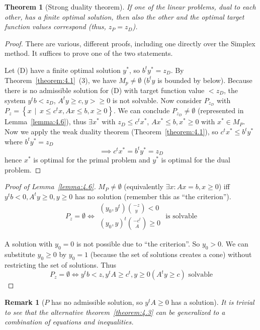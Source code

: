 \documentclass[a4paper]{article}
\newcounter{lecref}[section]
\numberwithin{lecref}{section}
\newtheorem{theorem}[lecref]{Theorem}
\newtheorem*{Remark}{Remark}
\newcommand{\SetDef}[2]{\left\{#1\,\mid\,#2\right\}}
\begin{document}
\begin{theorem}[Strong duality theorem]
	\label{theorem:4.5}
	If one of the linear problems, dual to each other, has a finite optimal solution, then also the other and the optimal target function values correspond (thus, $z_P = z_D$).
\end{theorem}

\begin{proof}
	There are various, different proofs, including one directly over the Simplex method.
	It suffices to prove one of the two statements.

	Let (D) have a finite optimal solution $y^*$, so $b^t y^* = z_D$.
	By Theorem~\ref{theorem:4.1}~(3), we have $M_p \neq \emptyset$ ($b^t y$ is bounded by below).
	Because there is no admissible solution for (D) with target function value $< z_D$, the system $y^t b < z_D$, $A^t y \geq c, y > \geq 0$ is not solvable.
	Now consider $P_{z_D}$ with $P_z = \SetDef{x}{x \leq c^t x, Ax \leq b, x \geq 0}$.
	We can conclude $P_{z_D} \neq \emptyset$ (represented in Lemma~\ref{lemma:4.6}), thus $\exists x^*$ with $z_D \leq c^t x^*$, $Ax^* \leq b, x^* \geq 0$ with $x^* \in M_P$.
	Now we apply the weak duality theorem (Theorem~\ref{theorem:4.1}), so $c^t x^* \leq b^t y^*$ where $b^t y^* = z_D$
	\[ \implies c^t x^* = b^t y^* = z_D \]
	hence $x^*$ is optimal for the primal problem and $y^*$ is optimal for the dual problem.
\end{proof}

\begin{proof}[Proof of Lemma~\ref{lemma:4.6}]
	$M_P \neq \emptyset$ (equivalently $\exists x: Ax = b, x \geq 0$) iff $y^t b < 0, A^t y \geq 0, y \geq 0$ has no solution (remember this as \enquote{the criterion}).
	\[ P_z = \emptyset \iff \begin{array}{c} (y_0, y^t) {-z \choose y} < 0 \\ (y_0, y)^t {-c^t \choose A} \geq 0 \end{array} \text{ is solvable} \]

	A solution with $y_0 = 0$ is not possible due to \enquote{the criterion}.
	So $y_0 > 0$. We can substitute $y_0 \geq 0$ by $y_0 = 1$ (because the set of solutions creates a cone) without restricting the set of solutions.
	Thus
	\[ P_z = \emptyset \iff y^t b < z, y^t A \geq c^t, y \geq 0 (A^t y \geq c) \text{ solvable} \]
\end{proof}

\begin{Remark}[$P$ has no admissible solution, so $y^t A \geq 0$ has a solution]
	It is trivial to see that the alternative theorem~\ref{theorem:4.3} can be generalized to a combination of equations and inequalities.
\end{Remark}
\end{document}
